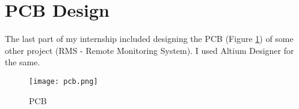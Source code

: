 \section{PCB Design}
The last part of my internship included designing the PCB (Figure \ref*{fig:pcb_out}) of some other project (RMS - Remote Monitoring System). I used Altium Designer for the same.
\begin{figure}[H]
    \centering
    \texttt{[image: pcb.png]}
    \caption{PCB}
    \label{fig:pcb_out}
\end{figure}